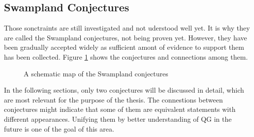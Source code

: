 \subsection{Swampland Conjectures}
Those sonctraints are still investigated and not uderstood well yet. It is why they are called the Swampland conjectures, not being proven yet. However, they have been gradually accepted widely as sufficient amont of evidence to support them has been collected. Figure \ref{fig:connection} shows the conjectures and connections among them.
\begin{figure}
    \centering
    \caption{A schematic map of the Swampland conjectures}
    \label{fig:connection}
\end{figure}
In the following sections, only two conjectures will be discussed in detail, which are most relevant for the purpose of the thesis. The connestions between conjectures might indicate that some of them are equivalent statements with different appearances. Unifying them by better understanding of QG in the future is one of the goal of this area.

